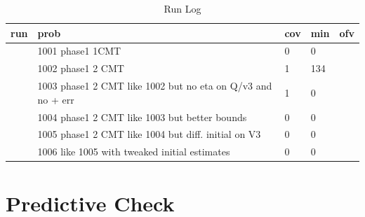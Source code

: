 \begin{table}[!htpb]
 \caption[Run Log]{Run Log \label{runlog}}
 \begin{center}
  \begin{tabular}{rlllr}
    \hline \hline
   run & prob & cov & min & ofv \\ \hline
   \verb#1001# & 1001 phase1 1CMT                                            & 0 & 0   & \verb#2526.40# \\
   \verb#1002# & 1002 phase1 2 CMT                                           & 1 & 134 & \verb#2525.97# \\
   \verb#1003# & 1003 phase1 2 CMT like 1002 but no eta on Q/v3 and no + err & 1 & 0   & \verb#2569.89# \\
   \verb#1004# & 1004 phase1 2 CMT like 1003 but better bounds               & 0 & 0   & \verb#2570.45# \\
   \verb#1005# & 1005 phase1 2 CMT like 1004 but diff. initial on V3         & 0 & 0   & \verb#2405.92# \\
   \verb#1006# & 1006 like 1005 with tweaked initial estimates               & 0 & 0   & \verb#2405.92# \\ \hline
  \end{tabular}
 \end{center}
\end{table}\section{Predictive Check}
